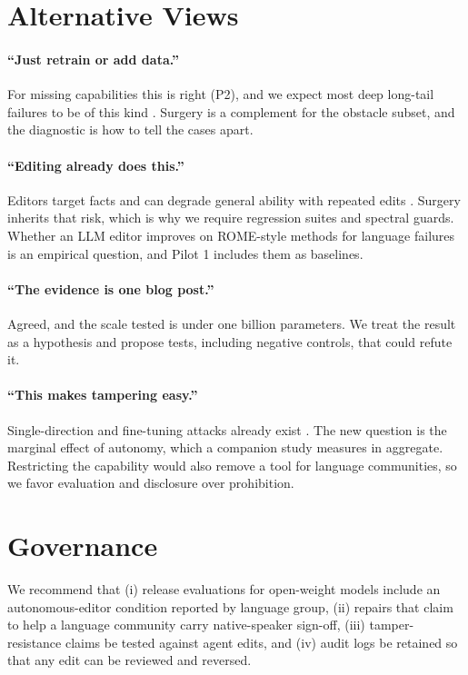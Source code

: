 \documentclass[11pt]{article}
\begin{document}
\section{Alternative Views}
\label{sec:alt}
\paragraph{``Just retrain or add data.''} For missing capabilities this is right (P2), and we expect most deep long-tail failures to be of this kind \citep{kandpal2023longtail}. Surgery is a complement for the obstacle subset, and the diagnostic is how to tell the cases apart.

\paragraph{``Editing already does this.''} Editors target facts and can degrade general ability with repeated edits \citep{meng2023memit,zhang2026revive}. Surgery inherits that risk, which is why we require regression suites and spectral guards. Whether an LLM editor improves on ROME-style methods for language failures is an empirical question, and Pilot 1 includes them as baselines.

\paragraph{``The evidence is one blog post.''} Agreed, and the scale tested is under one billion parameters. We treat the result as a hypothesis and propose tests, including negative controls, that could refute it.

\paragraph{``This makes tampering easy.''} Single-direction and fine-tuning attacks already exist \citep{arditi2024refusal,qi2024finetuning}. The new question is the marginal effect of autonomy, which a companion study measures in aggregate. Restricting the capability would also remove a tool for language communities, so we favor evaluation and disclosure over prohibition.

\section{Governance}
\label{sec:gov}
We recommend that (i) release evaluations for open-weight models include an autonomous-editor condition reported by language group, (ii) repairs that claim to help a language community carry native-speaker sign-off, (iii) tamper-resistance claims \citep{tamirisa2025tar} be tested against agent edits, and (iv) audit logs be retained so that any edit can be reviewed and reversed.
\end{document}
